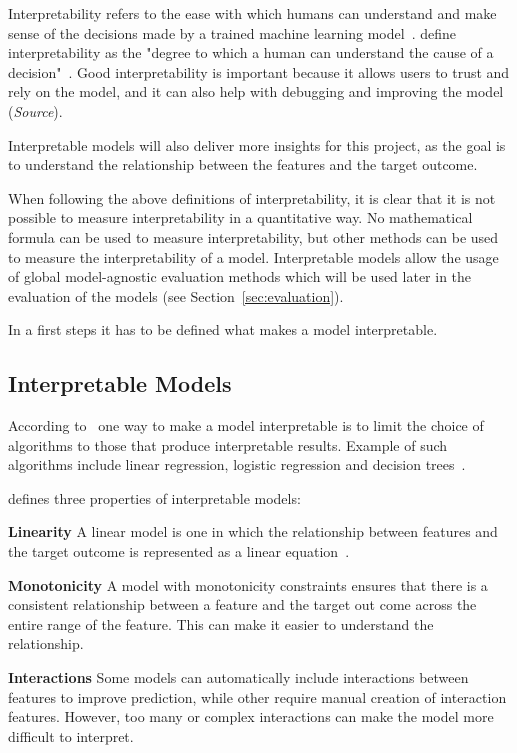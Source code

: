 Interpretability refers to the ease with which humans can understand and make
sense of the
decisions made by a trained machine learning model~\cite[p.
16]{siebert2022construction}.
\cite{miller2019explanation} define interpretability as the "degree to which
a human can
understand the cause of a decision"~\cite[p. 1]{miller2019explanation}.
Good interpretability is important because it allows users to trust and rely
on the model, and it
can also help with debugging and improving the model (\textit{Source}).

Interpretable models will also deliver more insights for this project, as the
goal is to
understand the relationship between the features and the target outcome.

When following the above definitions of interpretability, it is clear that it
is not possible to
measure interpretability in a quantitative way.
No mathematical formula can be used to measure interpretability, but other
methods can be used to
measure the interpretability of a model.
Interpretable models allow the usage of global model-agnostic evaluation
methods which will be
used later in the evaluation of the models (see Section~\ref{sec:evaluation}).

In a first steps it has to be defined what makes a model interpretable.

\subsection*{Interpretable Models}
According to~\cite{molnar2020interpretable} one way to make a model
interpretable is to limit the
choice of algorithms to those that produce interpretable results. Example of
such
algorithms include linear regression, logistic regression and decision
trees~\cite[p.
35]{molnar2020interpretable}.

\cite{molnar2020interpretable} defines three properties of interpretable models:

\textbf{Linearity} A linear model is one in which the relationship between
features and the
target outcome is represented as a linear
equation~\cite[]{molnar2020interpretable}.

\textbf{Monotonicity} A model with monotonicity constraints ensures that
there is a consistent
relationship between a feature and the target out come across the entire
range of the feature.
This can make it easier to understand the relationship.

\textbf{Interactions} Some models can automatically include
interactions between features to improve prediction, while other require
manual creation of
interaction features.
However, too many or complex interactions can make the model more
difficult to interpret.

